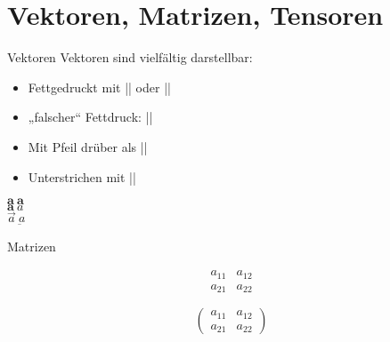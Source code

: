 \documentclass[
	vorläufig=true,
	datum=2016-11-04,
	titel={Mathematiksatz I},
	web=false,
]{../tex/latexkurs-slides}
\begin{document}
\section{Vektoren, Matrizen, Tensoren}
\begin{frame}[fragile,t]{Vektoren}
Vektoren sind vielfältig darstellbar:
\begin{itemize}
\item Fettgedruckt  mit |\boldsymbol| oder |\mathbf|
\item „falscher“ Fettdruck: |\pmb|
\item Mit Pfeil drüber als |\vec|\\[-1.28em]
\item Unterstrichen mit |\underbar|
\end{itemize}
\vfill
\begin{LTXexample}[pos=b, preset=\centering]
$ \boldsymbol a\ \mathbf a $ \\
$ \pmb a\ a $ \\
$ \vec a\ \underbar a $
\end{LTXexample}
\end{frame}

\begin{frame}[fragile]{Matrizen}
\begin{LTXexample}
\[
  \begin{matrix}
    a_{11} & a_{12}\\
    a_{21} & a_{22}
  \end{matrix}
\]
\end{LTXexample}
\pause
\begin{LTXexample}
\[
  \left(
    \begin{matrix}
      a_{11} & a_{12}\\
      a_{21} & a_{22}
    \end{matrix}
  \right)
\]
\end{LTXexample}
\end{frame}
\end{document}
